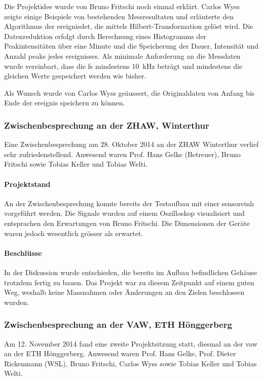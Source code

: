 Die Projektidee wurde von Bruno Fritschi noch einmal erklärt. Carlos Wyss zeigte einige Beispiele von bestehenden Messresultaten und erläuterte den Algorithmus der \gls{ereignisdet}, die mittels Hilbert-Transformation gelöst wird. Die Datenreduktion erfolgt durch Berechnung eines Histogramms der Peakintensitäten über eine Minute und die Speicherung der Dauer, Intensität und Anzahl \glspl{peak} jedes \gls{ereignis}ses. Als minimale Anforderung an die Messdaten wurde vereinbart, dass die \gls{fs} mindestens 10~kHz beträgt und mindestens die gleichen Werte gespeichert werden wie bisher.

Als Wunsch wurde von Carlos Wyss geäussert, die Originaldaten von Anfang bis Ende der \gls{ereignis} speichern zu können.


\subsubsection{Zwischenbesprechung an der ZHAW, Winterthur}
Eine Zwischenbesprechung am 28. Oktober 2014 an der ZHAW Winterthur verlief sehr zufriedenstellend. Anwesend waren Prof. Hans Gelke (Betreuer), Bruno Fritschi sowie Tobias Keller und Tobias Welti.

\paragraph{Projektstand} An der Zwischenbesprechung konnte bereits der Testaufbau mit einer \gls{sensoreinh} vorgeführt werden. Die Signale wurden auf einem Oszilloskop visualisiert und entsprachen den Erwartungen von Bruno Fritschi. Die Dimensionen der Geräte waren jedoch wesentlich grösser als erwartet. 

\paragraph{Beschlüsse} In der Diskussion wurde entschieden, die bereits im Aufbau befindlichen Gehäuse trotzdem fertig zu bauen. Das Projekt war zu diesem Zeitpunkt auf einem guten Weg, weshalb keine Massnahmen oder Änderungen an den Zielen beschlossen wurden.

\subsubsection{Zwischenbesprechung an der VAW, ETH Hönggerberg}
Am 12. November 2014 fand eine zweite Projektsitzung statt, diesmal an der \gls{vaw} an der ETH Hönggerberg. Anwesend waren Prof. Hans Gelke, Prof. Dieter Rickenmann (WSL), Bruno Fritschi, Carlos Wyss sowie Tobias Keller und Tobias Welti.

